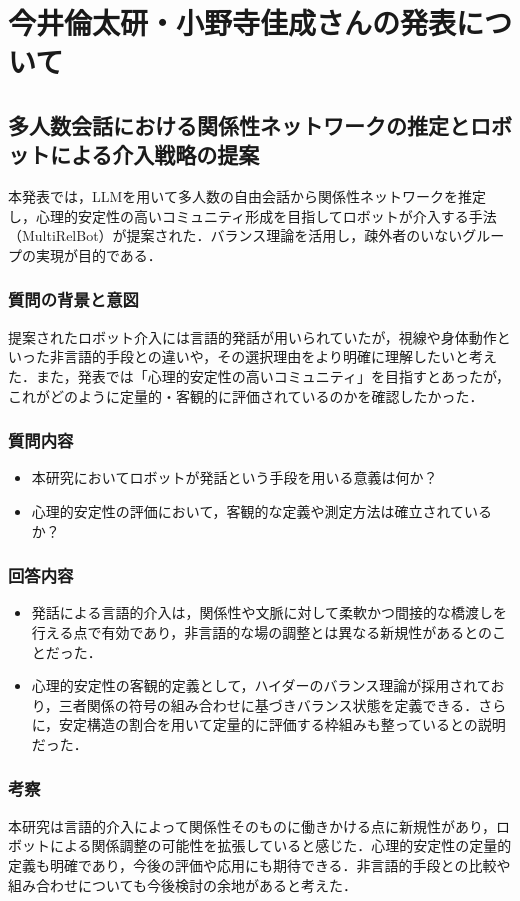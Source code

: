\section{今井倫太研・小野寺佳成さんの発表について}

\subsection{多人数会話における関係性ネットワークの推定とロボットによる介入戦略の提案}
本発表では，LLMを用いて多人数の自由会話から関係性ネットワークを推定し，心理的安定性の高いコミュニティ形成を目指してロボットが介入する手法（MultiRelBot）が提案された．バランス理論を活用し，疎外者のいないグループの実現が目的である．

\subsubsection{質問の背景と意図}
提案されたロボット介入には言語的発話が用いられていたが，視線や身体動作といった非言語的手段との違いや，その選択理由をより明確に理解したいと考えた．また，発表では「心理的安定性の高いコミュニティ」を目指すとあったが，これがどのように定量的・客観的に評価されているのかを確認したかった．

\subsubsection{質問内容}
\begin{itemize}
	\item 本研究においてロボットが発話という手段を用いる意義は何か？
	\item 心理的安定性の評価において，客観的な定義や測定方法は確立されているか？
\end{itemize}

\subsubsection{回答内容}
\begin{itemize}
	\item 発話による言語的介入は，関係性や文脈に対して柔軟かつ間接的な橋渡しを行える点で有効であり，非言語的な場の調整とは異なる新規性があるとのことだった．
	\item 心理的安定性の客観的定義として，ハイダーのバランス理論が採用されており，三者関係の符号の組み合わせに基づきバランス状態を定義できる．さらに，安定構造の割合を用いて定量的に評価する枠組みも整っているとの説明だった．
\end{itemize}

\subsubsection{考察}
本研究は言語的介入によって関係性そのものに働きかける点に新規性があり，ロボットによる関係調整の可能性を拡張していると感じた．心理的安定性の定量的定義も明確であり，今後の評価や応用にも期待できる．非言語的手段との比較や組み合わせについても今後検討の余地があると考えた．